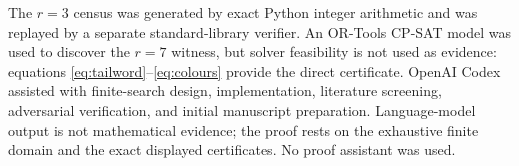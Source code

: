 \documentclass[11pt]{article}
\begin{document}
The \(r=3\) census was generated by exact Python integer arithmetic and was
replayed by a separate standard-library verifier.  An OR-Tools CP-SAT model
was used to discover the \(r=7\) witness, but solver feasibility is not used
as evidence: equations \eqref{eq:tailword}--\eqref{eq:colours} provide the
direct certificate.  OpenAI Codex assisted with finite-search design,
implementation, literature screening, adversarial verification, and initial
manuscript preparation.  Language-model output is not mathematical evidence;
the proof rests on the exhaustive finite domain and the exact displayed
certificates.  No proof assistant was used.



\end{document}
